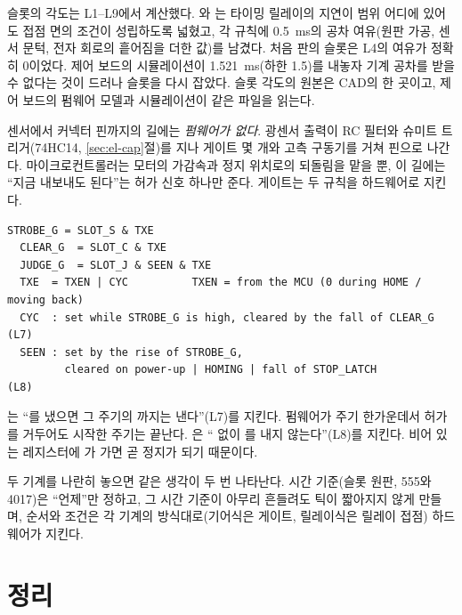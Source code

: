 \Ours 슬롯의 각도는 L1--L9에서 계산했다. 와 는 타이밍 릴레이의 지연이 범위 어디에 있어도
접점 면의 조건이 성립하도록 넓혔고, 각 규칙에 0.5~ms의 공차 여유(원판 가공, 센서 문턱, 전자 회로의 흩어짐을
더한 값)를 남겼다. 처음 판의 슬롯은 L4의 여유가 정확히 0이었다. 제어 보드의 시뮬레이션이 1.521~ms(하한
1.5)를 내놓자 기계 공차를 받을 수 없다는 것이 드러나 슬롯을 다시 잡았다. 슬롯 각도의 원본은 CAD의
 한 곳이고, 제어 보드의 펌웨어 모델과 시뮬레이션이 같은 파일을 읽는다.

센서에서 커넥터 핀까지의 길에는 \emph{펌웨어가 없다}. 광센서 출력이 RC 필터와 슈미트 트리거(74HC14, \ref{sec:el-cap}절)를 지나
게이트 몇 개와 고측 구동기를 거쳐 핀으로 나간다. 마이크로컨트롤러는 모터의 가감속과 정지 위치로의 되돌림을
맡을 뿐, 이 길에는 ``지금 내보내도 된다''는 허가 신호 하나만 준다. 게이트는 두 규칙을 하드웨어로 지킨다.

\begin{lstlisting}[numbers=none,caption={기어식 제어 보드의 타이밍 경로(\code{control-board/README.md} 1.1절).},label={lst:t-gate}]
  STROBE_G = SLOT_S & TXE
  CLEAR_G  = SLOT_C & TXE
  JUDGE_G  = SLOT_J & SEEN & TXE
  TXE  = TXEN | CYC          TXEN = from the MCU (0 during HOME / moving back)
  CYC  : set while STROBE_G is high, cleared by the fall of CLEAR_G        (L7)
  SEEN : set by the rise of STROBE_G,
         cleared on power-up | HOMING | fall of STOP_LATCH                   (L8)
\end{lstlisting}

는 ``를 냈으면 그 주기의 까지는 낸다''(L7)를 지킨다. 펌웨어가 주기 한가운데서
허가를 거두어도 시작한 주기는 끝난다. 은 `` 없이 를 내지 않는다''(L8)를
지킨다. 비어 있는 레지스터에 가 가면 곧 정지가 되기 때문이다.

두 기계를 나란히 놓으면 같은 생각이 두 번 나타난다. 시간 기준(슬롯 원판, 555와 4017)은 ``언제''만 정하고, 그
시간 기준이 아무리 흔들려도 틱이 짧아지지 않게 만들며, 순서와 조건은 각 기계의 방식대로(기어식은 게이트,
릴레이식은 릴레이 접점) 하드웨어가 지킨다.

\section{정리}

